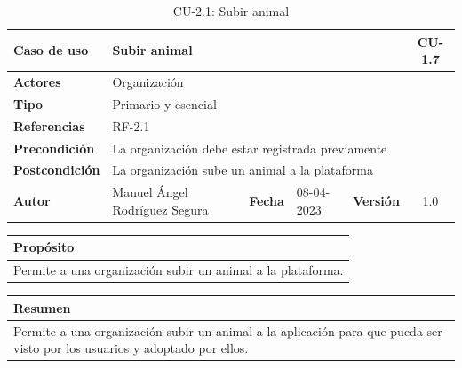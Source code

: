 \begin{table}[H]
    \begin{center}
        \begin{adjustbox}{width=\textwidth}
            \begin{tabular}{ | l | l | l | l | c | c | }
                \hline
                \textbf{Caso de uso} & \multicolumn{4}{l|}{Subir animal} & \cellcolor{gray!50} \textbf{CU-1.7}\\
                \hline
                \textbf{Actores} & \multicolumn{5}{p{0.5\linewidth}|}{Organización} \\
                \hline
                \textbf{Tipo} & \multicolumn{5}{l|}{Primario y esencial} \\
                \hline
                \textbf{Referencias} & \multicolumn{3}{l|}{RF-2.1} & \multicolumn{2}{l|}{ }\\
                \hline
                \textbf{Precondición} & \multicolumn{5}{l|}{La organización debe estar registrada previamente} \\
                \hline
                \textbf{Postcondición} & \multicolumn{5}{l|}{La organización sube un animal a la plataforma} \\
                \hline
                \textbf{Autor} & \multicolumn{1}{p{0.25\linewidth}|}{Manuel Ángel Rodríguez Segura} & \textbf{Fecha} &
                08-04-2023     & \textbf{Versión}                                                      & 1.0\\
                \hline
            \end{tabular}
        \end{adjustbox}
        \caption{CU-2.1: Subir animal}
        \label{tab:subir-animal}
    \end{center}
\end{table}

\begin{table}[H]
    \centering
    \begin{tabularx}{\textwidth}{@{} |L |@{}} \hline
        \textbf{Propósito} \\
        \hline
        Permite a una organización subir un animal a la plataforma. \\
        \hline
    \end{tabularx}
\end{table}

\begin{table}[H]
    \centering
    \begin{tabularx}{\textwidth}{@{} |L |@{}} \hline
        \textbf{Resumen} \\
        \hline
        Permite a una organización subir un animal a la aplicación para que pueda ser visto por los usuarios y adoptado
        por ellos. \\
        \hline
    \end{tabularx}
\end{table}

